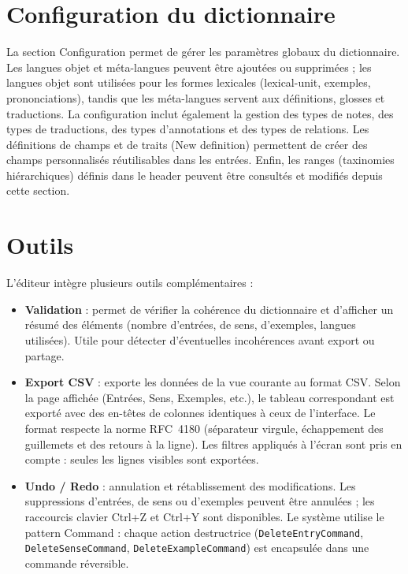 \documentclass[11pt,twoside,openany]{book}
\begin{document}
\section{Configuration du dictionnaire}

La section Configuration permet de gérer les paramètres globaux du dictionnaire. Les langues objet et méta-langues peuvent être ajoutées ou supprimées ; les langues objet sont utilisées pour les formes lexicales (lexical-unit, exemples, prononciations), tandis que les méta-langues servent aux définitions, glosses et traductions. La configuration inclut également la gestion des types de notes, des types de traductions, des types d'annotations et des types de relations. Les définitions de champs et de traits (New definition) permettent de créer des champs personnalisés réutilisables dans les entrées. Enfin, les ranges (taxinomies hiérarchiques) définis dans le header peuvent être consultés et modifiés depuis cette section.

\section{Outils}

L'éditeur intègre plusieurs outils complémentaires :

\begin{itemize}
\item \textbf{Validation} : permet de vérifier la cohérence du dictionnaire et d'afficher un résumé des éléments (nombre d'entrées, de sens, d'exemples, langues utilisées). Utile pour détecter d'éventuelles incohérences avant export ou partage.
\item \textbf{Export CSV} : exporte les données de la vue courante au format CSV. Selon la page affichée (Entrées, Sens, Exemples, etc.), le tableau correspondant est exporté avec des en-têtes de colonnes identiques à ceux de l'interface. Le format respecte la norme RFC~4180 (séparateur virgule, échappement des guillemets et des retours à la ligne). Les filtres appliqués à l'écran sont pris en compte : seules les lignes visibles sont exportées.
\item \textbf{Undo / Redo} : annulation et rétablissement des modifications. Les suppressions d'entrées, de sens ou d'exemples peuvent être annulées ; les raccourcis clavier Ctrl+Z et Ctrl+Y sont disponibles. Le système utilise le pattern Command : chaque action destructrice (\texttt{DeleteEntryCommand}, \texttt{DeleteSenseCommand}, \texttt{DeleteExampleCommand}) est encapsulée dans une commande réversible.
\end{itemize}
\end{document}
